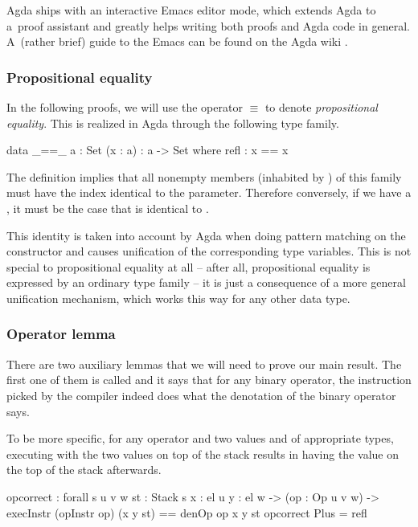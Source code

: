 Agda ships with an interactive Emacs editor mode, which extends Agda to a~proof
assistant and greatly helps writing both proofs and Agda code in general. A~(rather brief) guide
to the Emacs  can be found on the Agda wiki \cite{agda-mode}.

\subsubsection{Propositional equality}

In the following proofs, we will use the operator $\equiv$ to denote
\emph{propositional equality}. This is realized in Agda through the following
type family.

\begin{code}
  data _==_ {a : Set} (x : a) : a -> Set where
    refl : x == x
\end{code}

\noindent The definition implies that all nonempty members (inhabited by ) of this
family must have the index identical to the parameter.
Therefore conversely, if we have a , it must be the case that 
is identical to .

This identity is taken into account by Agda when doing pattern matching on the constructor
 and causes unification of the corresponding type variables. This is not special
to propositional equality at all -- after all, propositional equality is expressed by
an ordinary type family -- it is just a consequence of a more general unification mechanism,
which works this way for any other data type.

\subsubsection{Operator lemma}

There are two auxiliary lemmas that we will need to prove our main result. The
first one of them is called  and it says that for any binary
operator, the instruction picked by the compiler indeed does what the
denotation of the binary operator says.

To be more specific, for any operator  and two values  and
 of appropriate types, executing  with the two
values on top of the stack results in having the value 
on the top of the stack afterwards.

\label{sec:cor-op-correct}\begin{code}
  op\-correct : forall {s u v w} {st : Stack s} {x : el u} {y : el w}
    -> (op : Op u v w)
    -> execInstr (opInstr op) (x \scons y \scons st) == denOp op x y \scons st
  op\-correct Plus = refl
\end{code}

